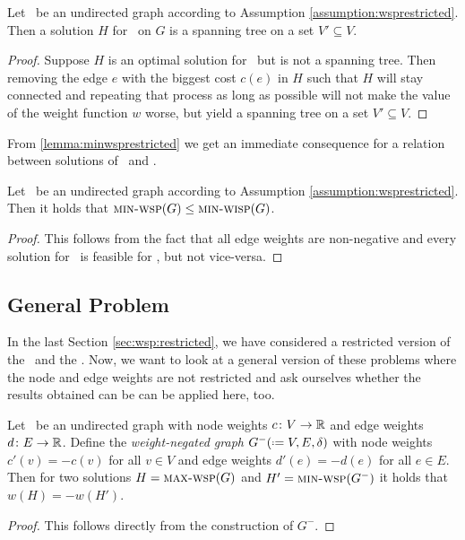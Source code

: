 \begin{lemma}
	\label{lemma:minwsprestricted}
	Let \ugraph\ be an undirected graph according to Assumption \ref{assumption:wsprestricted}. Then a solution $H$ for \minWSP\ on $G$ is a spanning tree on a set $V' \subseteq V$.
\end{lemma}
\begin{proof}
	Suppose $H$ is an optimal solution for \minWSP\ but is not a spanning tree. Then removing the edge $e$ with the biggest cost $c(e)$ in $H$ such that $H$ will stay connected and repeating that process as long as possible will not make the value of the weight function $w$ worse, but yield a spanning tree on a set $V' \subseteq V$.
\end{proof}

From \ref{lemma:minwsprestricted} we get an immediate consequence for a relation between solutions of \minWSP\ and \minWISP.

\begin{corollary}
	\label{cor:minwsp}
	Let \ugraph\ be an undirected graph according to Assumption \ref{assumption:wsprestricted}. Then it holds that $\text{\textsc{min-wsp}}(G) \leq \text{\textsc{min-wisp}}(G)$.
\end{corollary}
\begin{proof}
	This follows from the fact that all edge weights are non-negative and every solution for \minWISP\ is feasible for \minWSP, but not vice-versa.
\end{proof}

\subsection{General Problem}
\label{sec:wsp:general}

In the last Section \ref{sec:wsp:restricted}, we have considered a restricted version of the \WSP\ and the \WISP. Now, we want to look at a general version of these problems where the node and edge weights are not restricted and ask ourselves whether the results obtained can be can be applied here, too.

\begin{lemma}
	\label{lemma:wspnegation}
	Let \ugraph\ be an undirected graph with node weights $c\colon V \to \mathbb{R}$ and edge weights $d\colon E \to \mathbb{R}$. Define the \textit{weight-negated graph} $G^- (\defeq V, E, \delta)$ with node weights $c'(v) = -c(v)$ for all $v \in V$ and edge weights $d'(e) = -d(e)$ for all $e \in E$. Then for two solutions $H = \text{\textsc{max-wsp}}(G)$ and $H' = \text{\textsc{min-wsp}}(G^-)$ it holds that $w(H) = -w(H')$.
\end{lemma}
\begin{proof}
	This follows directly from the construction of $G^-$.
\end{proof}

